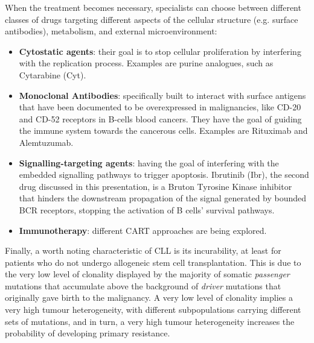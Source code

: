 When the treatment becomes necessary, specialists can choose between different classes of drugs targeting different aspects of the cellular structure (e.g. surface antibodies), metabolism, and external microenvironment:
\begin{itemize}
	\item \textbf{Cytostatic agents}: their goal is to stop cellular proliferation by interfering with the replication process. Examples are purine analogues, such as Cytarabine (Cyt).
	\item \textbf{Monoclonal Antibodies}: specifically built to interact with surface antigens that have been documented to be overexpressed in malignancies, like CD-20 and CD-52 receptors in B-cells blood cancers. They have the goal of guiding the immune system towards the cancerous cells. Examples are Rituximab and Alemtuzumab.
	\item \textbf{Signalling-targeting agents}: having the goal of interfering with the embedded signalling pathways to trigger apoptosis. Ibrutinib (Ibr), the second drug discussed in this presentation, is a Bruton Tyrosine Kinase inhibitor that hinders the downstream propagation of the signal generated by bounded BCR receptors, stopping the activation of B cells' survival pathways. 
	\item \textbf{Immunotherapy}: different CART approaches are being explored.
\end{itemize} \par
\vspace{0.4cm}
Finally, a worth noting characteristic of CLL is its incurability, at least for patients who do not undergo allogeneic stem cell transplantation. This is due to the very low level of clonality displayed by the majority of somatic \textit{passenger} mutations that accumulate above the background of \textit{driver} mutations that originally gave birth to the malignancy. A very low level of clonality implies a very high tumour heterogeneity, with different subpopulations carrying different sets of mutations, and in turn, a very high tumour heterogeneity increases the probability of developing primary resistance. \par


